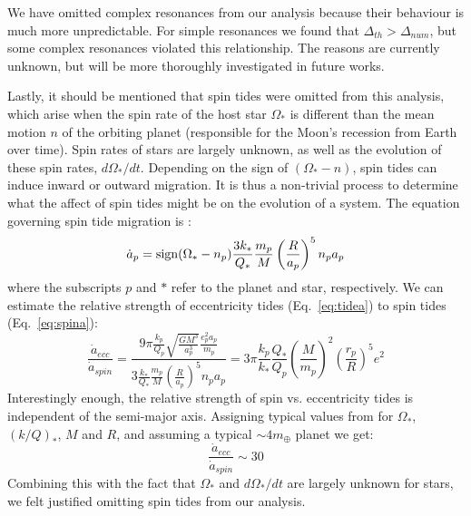 We have omitted complex resonances from our analysis because their behaviour is much more unpredictable. 
For simple resonances we found that $\Delta_{th} > \Delta_{num}$, but some complex resonances violated this relationship. 
The reasons are currently unknown, but will be more thoroughly investigated in future works. 

Lastly, it should be mentioned that spin tides were omitted from this analysis, which arise when the spin rate of the host star $\Omega_*$ is different than the mean motion $n$ of the orbiting planet (responsible for the Moon's recession from Earth over time). 
Spin rates of \kep{} stars are largely unknown, as well as the evolution of these spin rates, $d\Omega_*/dt$. 
Depending on the sign of $(\Omega_* - n)$, spin tides can induce inward or outward migration. 
It is thus a non-trivial process to determine what the affect of spin tides might be on the evolution of a system. 
The equation governing spin tide migration is \citep{SSD1999}:
\begin{equation}
\dot{a}_p = {\rm sign}(\Omega_* - n_p)\frac{3k_*}{Q_*}\frac{m_p}{M}\left(\frac{R}{a_p}\right)^5 n_pa_p
\label{eq:spina}
\end{equation}
where the subscripts $p$ and $*$ refer to the planet and star, respectively. 
We can estimate the relative strength of eccentricity tides (Eq.~\ref{eq:tidea}) to spin tides (Eq.~\ref{eq:spina}):
\begin{equation*}
\frac{\dot{a}_{ecc}}{\dot{a}_{spin}} = \frac{9\pi\frac{k_p}{Q_p} \sqrt{\frac{GM^3}{a_p^3}} \frac{e_p^2a_p}{m_p}}{ 3\frac{k_*}{Q_*}\frac{m_p}{M}\left(\frac{R}{a_p}\right)^5 n_pa_p} = 3\pi\frac{k_p}{k_*}\frac{Q_*}{Q_p}\left(\frac{M}{m_p} \right)^2 \left(\frac{r_p}{R} \right)^5 e^2
\end{equation*}
Interestingly enough, the relative strength of spin vs. eccentricity tides is independent of the semi-major axis.
Assigning typical values from \citet{WuMurray2003} for $\Omega_*$, $(k/Q)_*$, $M$ and $R$, and assuming a typical $\sim 4m_{\oplus}$ planet we get:
\begin{equation}
\frac{\dot{a}_{ecc}}{\dot{a}_{spin}} \sim 30
\end{equation}
Combining this with the fact that $\Omega_*$ and $d\Omega_*/dt$ are largely unknown for \kep{} stars, we felt justified omitting spin tides from our analysis.

